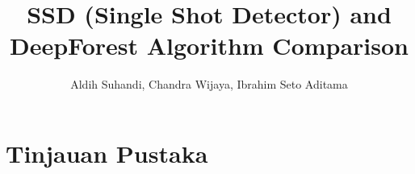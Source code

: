 \documentclass[a4paper]{article}
\begin{document}
\linespread{1.5}

\title{SSD (Single Shot Detector) and DeepForest Algorithm Comparison}
\author{Aldih Suhandi, Chandra Wijaya, Ibrahim Seto Aditama}

\maketitle

\newpage

\tableofcontents
\newpage

\section*{Tinjauan Pustaka}
\end{document}
